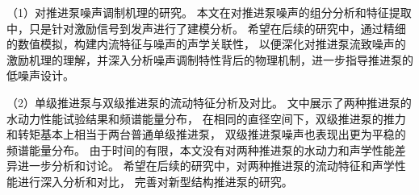 （1）对推进泵噪声调制机理的研究。
本文在对推进泵噪声的组分分析和特征提取中，只是针对激励信号到发声进行了建模分析。
希望在后续的研究中，通过精细的数值模拟，构建内流特征与噪声的声学关联性，
以便深化对推进泵流致噪声的激励机理的理解，并深入分析噪声调制特性背后的物理机制，进一步指导推进泵的低噪声设计。

（2）单级推进泵与双级推进泵的流动特征分析及对比。
文中展示了两种推进泵的水动力性能试验结果和频谱能量分布，
在相同的直径空间下，双级推进泵的推力和转矩基本上相当于两台普通单级推进泵，
双级推进泵噪声也表现出更为平稳的频谱能量分布。
由于时间的有限，本文没有对两种推进泵的水动力和声学性能差异进一步分析和讨论。
希望在后续的研究中，对两种推进泵的流动特征和声学性能进行深入分析和对比，
完善对新型结构推进泵的研究。


